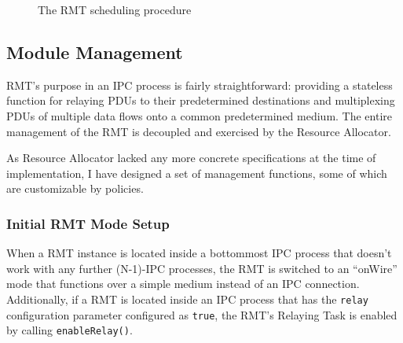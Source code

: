             \begin{figure}[H]
                \begin{center}
                  \caption{The RMT scheduling procedure}
                  \label{fig:sched-petri}
                \end{center}
            \end{figure}

        \subsection{Module Management}\label{implementation:mgmt}

            RMT's purpose in an IPC process is fairly straightforward: providing a stateless function for relaying PDUs to their predetermined destinations and multiplexing PDUs of multiple data flows onto a common predetermined medium. The entire management of the RMT is decoupled and exercised by the Resource Allocator.

            As Resource Allocator lacked any more concrete specifications at the time of implementation, I have designed a set of management functions, some of which are customizable by policies.

            \subsubsection{Initial RMT Mode Setup}

                When a RMT instance is located inside a bottommost IPC process that doesn't work with any further (N-1)-IPC processes, the RMT is switched to an ``onWire'' mode that functions over a simple medium instead of an IPC connection. Additionally, if a RMT is located inside an IPC process that has the \texttt{relay} configuration parameter configured as \texttt{true}, the RMT's Relaying Task is enabled by calling \texttt{enableRelay()}.


